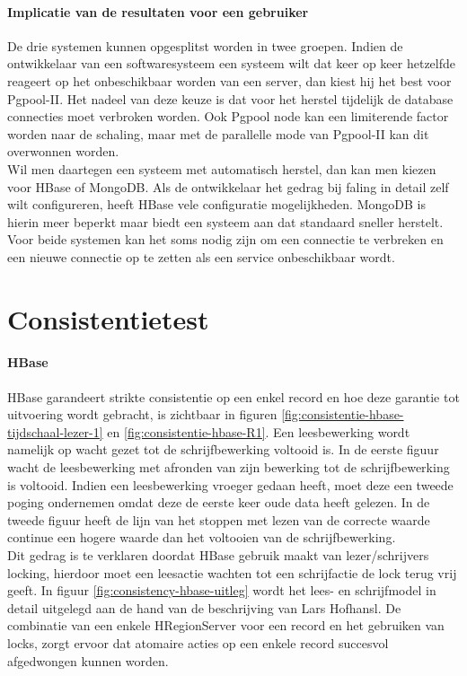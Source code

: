 \paragraph{Implicatie van de resultaten voor een gebruiker} De drie systemen kunnen opgesplitst worden in twee groepen. Indien de ontwikkelaar van een softwaresysteem een systeem wilt dat keer op keer hetzelfde reageert op het onbeschikbaar worden van een server, dan kiest hij het best voor Pgpool-II. Het nadeel van deze keuze is dat voor het herstel tijdelijk de database connecties moet verbroken worden. Ook Pgpool node kan een limiterende factor worden naar de schaling, maar met de parallelle mode van Pgpool-II kan dit overwonnen worden. \\

Wil men daartegen een systeem met automatisch herstel, dan kan men kiezen voor HBase of MongoDB. Als de ontwikkelaar het gedrag bij faling in detail zelf wilt configureren, heeft HBase vele configuratie mogelijkheden. MongoDB is hierin meer beperkt maar biedt een systeem aan dat standaard sneller herstelt. Voor beide systemen kan het soms nodig zijn om een connectie te verbreken en een nieuwe connectie op te zetten als een service onbeschikbaar wordt. 

\section{Consistentietest}
\paragraph{HBase} HBase garandeert strikte consistentie op een enkel record en hoe deze garantie tot uitvoering wordt gebracht, is zichtbaar in figuren \ref{fig:consistentie-hbase-tijdschaal-lezer-1} en \ref{fig:consistentie-hbase-R1}. Een leesbewerking wordt namelijk op wacht gezet tot de schrijfbewerking voltooid is. In de eerste figuur wacht de leesbewerking met afronden van zijn bewerking tot de schrijfbewerking is voltooid. Indien een leesbewerking vroeger gedaan heeft, moet deze een tweede poging ondernemen omdat deze de eerste keer oude data heeft gelezen. In de tweede figuur heeft de lijn van het stoppen met lezen van de correcte waarde continue een hogere waarde dan het voltooien van de schrijfbewerking. \\
Dit gedrag is te verklaren doordat HBase gebruik maakt van lezer/schrijvers locking, hierdoor moet een leesactie wachten tot een schrijfactie de lock terug vrij geeft. In figuur \ref{fig:consistency-hbase-uitleg} wordt het lees- en schrijfmodel in detail uitgelegd aan de hand van de beschrijving van Lars Hofhansl\cite{hbase-acid}. De combinatie van een enkele HRegionServer voor een record en het gebruiken van locks, zorgt ervoor dat atomaire acties op een enkele record succesvol afgedwongen kunnen worden.     

